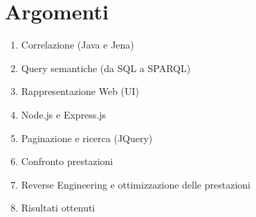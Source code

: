 \documentclass[Lau,binding=0.6cm,noexaminfo,oneside]{sapthesis}
\begin{document}
\chapter*{Argomenti}
\begin{enumerate}
  \item Correlazione (Java e Jena)
  \item Query semantiche (da SQL a SPARQL)
  \item Rappresentazione Web (UI)
  \item Node.js e Express.js
  \item Paginazione e ricerca (JQuery)
  \item Confronto prestazioni
  \item Reverse Engineering e ottimizzazione delle prestazioni
  \item Risultati ottenuti
\end{enumerate}

\backmatter
\cleardoublepage
\end{document}
